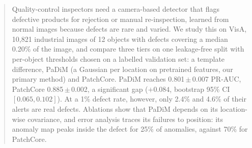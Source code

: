 \begin{abstract}
Quality-control inspectors need a camera-based detector that flags defective products for rejection or
manual re-inspection, learned from normal images because defects are rare and varied.
We study this on VisA, 10,821 industrial images of 12 objects with defects covering a median 0.20\% of
the image, and compare three tiers on one leakage-free split with per-object thresholds chosen on a
labelled validation set: a template difference, PaDiM (a Gaussian per location on pretrained features,
our primary method) and PatchCore.
PaDiM reaches 0.801\,$\pm$\,0.007 PR-AUC, PatchCore 0.885\,$\pm$\,0.002, a significant gap
($+0.084$, bootstrap 95\% CI $[0.065, 0.102]$).
At a 1\% defect rate, however, only 2.4\% and 4.6\% of their alerts are real defects.
Ablations show that PaDiM depends on its location-wise covariance, and error analysis traces its
failures to position: its anomaly map peaks inside the defect for 25\% of anomalies, against 70\% for
PatchCore.
\end{abstract}
